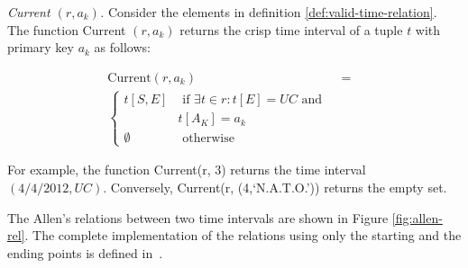\begin{definition}
\label{def:current-in-relation}
\emph{Current $\left(r,a_k \right)$.}
Consider the elements in definition \ref{def:valid-time-relation}. The function Current $\left(r,a_k \right)$ returns the crisp time interval of a tuple $t$ with primary key $a_k$ as follows:
% 


\begin{align}
\label{eq:current-in-relation}
\mbox{Current} \left(r, a_k\right) &=& \\ 
\begin{cases}
\nonumber
t[S,E] & \mbox{ if } \exists t \in r : t[E]=UC \mbox{ and }\\
& t[A_K]=a_k \\
\emptyset & \mbox{ otherwise}
\end{cases}
\end{align}
\end{definition}

For example, the function Current(r, 3) returns the time interval $\left(4/4/2012 , UC  \right)$. Conversely, Current(r, (4,`N.A.T.O.')) returns the empty set.


The Allen's relations between two time intervals are shown in Figure \ref{fig:allen-rel}. The complete implementation of the relations using only the starting and the ending points is defined in~\cite{Nagypal2003}.


